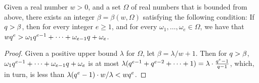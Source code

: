 \documentclass{article}
\begin{document}
%
%
%

\begin{lemma}
   \label{positive-polynomial: L}
   Given a real number $w > 0$, and a set $\Omega$ of real numbers that is bounded from above, there exists an integer $\beta = \beta(w, \Omega)$ satisfying the following condition\textup:
   If $q > \beta$, then for every integer $e \geq 1$, and for every $\omega_1, \ldots, \omega_e \in \Omega$, we have that $wq^{e} >  \omega_1 q^{e-1} + \cdots + \omega_{e-1} q + \omega_e$.
\end{lemma}

\begin{proof}
   Given a positive upper bound $\lambda$ for $\Omega$, let $\beta = \lambda/w  + 1$.
   Then for $q>\beta$, $\omega_1 q^{e-1} + \cdots + \omega_{e-1}  q + \omega_e$ is at most $\lambda(q^{e-1} + q^{e-2} + \cdots + 1) = \lambda \cdot \frac{q^e-1}{q-1}$, which, in turn, is less than $\lambda (q^e-1) \cdot w/\lambda < w q^e$.
\end{proof}
\end{document}
